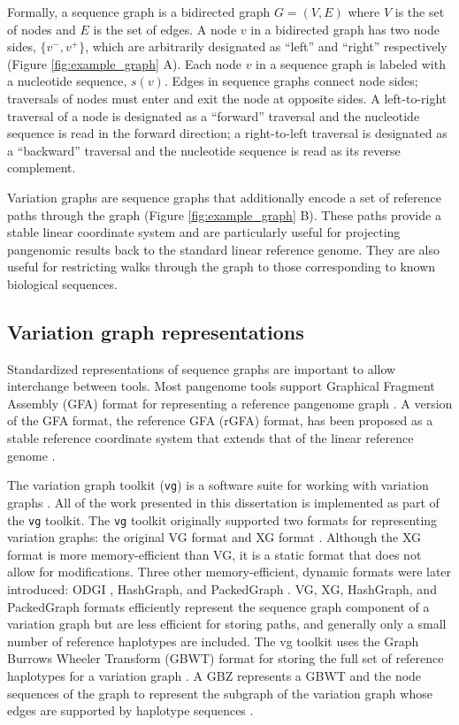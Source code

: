 \documentclass[11pt]{ucscthesis}
\begin{document}
Formally, a sequence graph is a bidirected graph $G = (V, E)$ where $V$ is the set of nodes and $E$ is the set of edges.
A node $v$ in a bidirected graph has two node sides, $\{v^{-}, v^{+}\}$, which are arbitrarily designated as ``left'' and ``right'' respectively (Figure \ref{fig:example_graph} A).
Each node $v$ in a sequence graph is labeled with a nucleotide sequence, $s(v)$.
Edges in sequence graphs connect node sides; traversals of nodes must enter and exit the node at opposite sides.
A left-to-right traversal of a node is designated as a ``forward'' traversal and the nucleotide sequence is read in the forward direction; a right-to-left traversal is designated as a ``backward'' traversal and the nucleotide sequence is read as its reverse complement.

Variation graphs are sequence graphs that additionally encode a set of reference paths through the graph (Figure \ref{fig:example_graph} B).
These paths provide a stable linear coordinate system and are particularly useful for projecting pangenomic results back to the standard linear reference genome.
They are also useful for restricting walks through the graph to those corresponding to known biological sequences.

\subsection{Variation graph representations}

Standardized representations of sequence graphs are important to allow interchange between tools.
Most pangenome tools support Graphical Fragment Assembly (GFA) format for representing a reference pangenome graph \cite{eizenga_pangenome_2020}. 
A version of the GFA format, the reference GFA (rGFA) format, has been proposed as a stable reference coordinate system that extends that of the linear reference genome \cite{li_minigraph_2020}. 

The variation graph toolkit (\texttt{vg}) is a software suite for working with variation graphs \cite{garrison_vg_2018}.
All of the work presented in this dissertation is implemented as part of the \texttt{vg} toolkit.
The \texttt{vg} toolkit originally supported two formats for representing variation graphs: the original VG format and XG format \cite{garrison_vg_2018}.
Although the XG format is more memory-efficient than VG, it is a static format that does not allow for modifications.
Three other memory-efficient, dynamic formats were later introduced: ODGI \cite{guarracino_odgi_2022}, HashGraph, and PackedGraph \cite{eizenga2020efficient}.
VG, XG, HashGraph, and PackedGraph formats efficiently represent the sequence graph component of a variation graph but are less efficient for storing paths, and generally only a small number of reference haplotypes are included.
The vg toolkit uses the Graph Burrows Wheeler Transform (GBWT) format for storing the full set of reference haplotypes for a variation graph \cite{siren_indexes_2020}.
A GBZ represents a GBWT and the node sequences of the graph to represent the subgraph of the variation graph whose edges are supported by haplotype sequences \cite{siren_gbz_2022}.
\end{document}
